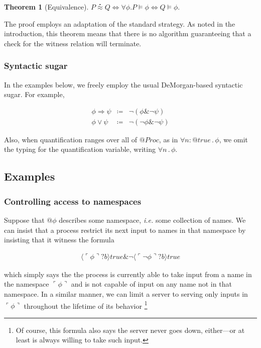 \documentclass[]{amsart}
\makeatletter
\newcommand{\lpquote}{\ulcorner}
\newcommand{\rpquote}{\urcorner}
\newcommand{\quotep}[1]{@#1}
\newcommand{\QProc}{\quotep{\mathbin{Proc}}}
\newcommand{\defneqls}{\coloneqq}
\newcommand{\wbbisim}{\stackrel{\centerdot}{\approx}} %
\newcommand{\ptrue}{\mathbin{true}}
\newcommand{\pquotep}[1]{\lpquote #1 \rpquote}
\newcommand{\pprefix}[3]{\langle #1 ? #2 \rangle #3}
\newcommand{\pquant}[3]{\forall #1 \mathbin{:} #2 \mathbin{.} #3}
\newcommand{\pquantuntyped}[2]{\forall #1 \mathbin{.} #2}
\newcommand{\riff}{\Leftrightarrow}
\newtheorem{thm}{Theorem}[subsection]
\theoremstyle{definition}
\theoremstyle{remark}
\numberwithin{equation}{subsection}
\makeatother
\begin{document}
\begin{thm}[Equivalence]
	$P \wbbisim Q \riff \forall \phi . P \models \phi \riff Q \models \phi .$
\end{thm}

The proof employs an adaptation of the standard strategy. As noted in
the introduction, this theorem means that there is no algorithm
guaranteeing that a check for the witness relation will terminate.

\subsubsection{Syntactic sugar }

In the examples below, we freely employ the usual DeMorgan-based
syntactic sugar. For example,

\begin{eqnarray}
	\phi \Rightarrow \psi & \defneqls & \neg ( \phi \& \neg \psi ) \nonumber\\
	\phi \vee \psi & \defneqls & \neg ( \neg \phi \& \neg \psi ) \nonumber
\end{eqnarray}

Also, when quantification ranges over all of $\QProc$, as in
$\pquant{n}{\quotep{\ptrue}}{\phi}$, we omit the typing for the
quantification variable, writing $\pquantuntyped{n}{\phi}$.

\subsection{Examples}

\subsubsection{Controlling access to namespaces}
\label{namespace}
Suppose that $\quotep{\phi}$ describes some namespace, {\em i.e.} some
collection of names. We can insist that a process restrict its next
input to names in that namespace by insisting that it witness the formula

\begin{eqnarray}
  \pprefix{\pquotep{\phi}}{b}{\ptrue} \& \neg \pprefix{\pquotep{\neg \phi}}{b}{\ptrue} \nonumber
\end{eqnarray}

\noindent which simply says the the process is currently able to take input from
a name in the namespace $\pquotep{\phi}$ and is not capable of input on
any name not in that namespace. In a similar manner, we can limit a
server to serving only inputs in $\pquotep{\phi}$ throughout the
lifetime of its behavior \footnote{Of course, this formula also says
the server never goes down, either---or at least is always willing
to take such input.}
\end{document}
